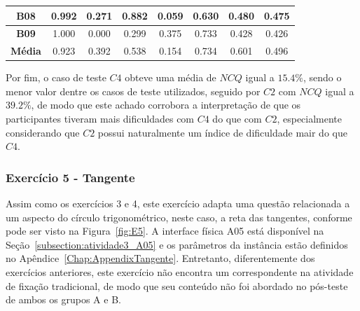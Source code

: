 \begin{table}[htbp]
\begin{tabular}{|c|cccccc|c|}
		\rowcolor[HTML]{E7E6E6} 
		\textbf{B08} & \multicolumn{1}{c|}{\cellcolor[HTML]{E7E6E6}0.992} & \multicolumn{1}{c|}{\cellcolor[HTML]{E7E6E6}0.271} & \multicolumn{1}{c|}{\cellcolor[HTML]{E7E6E6}0.882} & \multicolumn{1}{c|}{\cellcolor[HTML]{E7E6E6}0.059} & \multicolumn{1}{c|}{\cellcolor[HTML]{E7E6E6}0.630} & 0.480 & 0.475 \\ \hline
		\rowcolor[HTML]{FFFFFF} 
		\textbf{B09} & \multicolumn{1}{c|}{\cellcolor[HTML]{FFFFFF}1.000} & \multicolumn{1}{c|}{\cellcolor[HTML]{FFFFFF}0.000} & \multicolumn{1}{c|}{\cellcolor[HTML]{FFFFFF}0.299} & \multicolumn{1}{c|}{\cellcolor[HTML]{FFFFFF}0.375} & \multicolumn{1}{c|}{\cellcolor[HTML]{FFFFFF}0.733} & 0.428 & 0.426 \\ \hline
		\rowcolor[HTML]{D9D9D9} 
		\textbf{Média} & \multicolumn{1}{c|}{\cellcolor[HTML]{D9D9D9}0.923} & \multicolumn{1}{c|}{\cellcolor[HTML]{D9D9D9}0.392} & \multicolumn{1}{c|}{\cellcolor[HTML]{D9D9D9}0.538} & \multicolumn{1}{c|}{\cellcolor[HTML]{D9D9D9}0.154} & \multicolumn{1}{c|}{\cellcolor[HTML]{D9D9D9}0.734} & 0.601 & 0.496 \\ \hline
	\end{tabular}
	\label{tab:F3_A4_NCQ}
\end{table}

Por fim, o caso de teste $C4$ obteve uma média de $NCQ$ igual a $15.4\%$, sendo o menor valor dentre os casos de teste utilizados, seguido por $C2$ com $NCQ$ igual a $39.2\%$, de modo que este achado corrobora a interpretação de que os participantes tiveram mais dificuldades com $C4$ do que com $C2$, especialmente considerando que $C2$ possui naturalmente um índice de dificuldade mair do que $C4$.

\subsubsection{Exercício 5 - Tangente}\label{subsubsec:F3A5}

Assim como os exercícios 3 e 4, este exercício adapta uma questão relacionada a um aspecto do círculo trigonométrico, neste caso, a reta das tangentes, conforme pode ser visto na Figura~\ref{fig:E5}. A interface física A05 está disponível na Seção~\ref{subsection:atividade3_A05} e os parâmetros da instância estão definidos no Apêndice~\ref{Chap:AppendixTangente}. Entretanto, diferentemente dos exercícios anteriores, este exercício não encontra um correspondente na atividade de fixação tradicional, de modo que seu conteúdo não foi abordado no pós-teste de ambos os grupos A e B.

